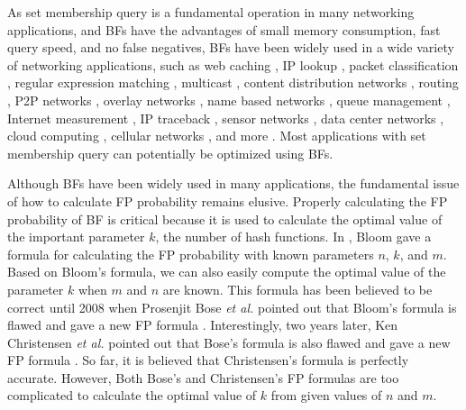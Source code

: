 As set membership query is a fundamental operation in many networking applications, and BFs have the advantages of small memory consumption, fast query speed, and no false negatives, BFs have been widely used in a wide variety of networking applications, such as web caching \cite{webcaching, compressedBFpatent}, IP lookup \cite{sig03PBF, BF_TC, songsig05, HASH-100G}, packet classification \cite{Info04ACPC, Info08memoryPC}, regular expression matching \cite{HPI03deep, HardwareREM}, multicast \cite{BloomCast, Sig02Multicast}, content distribution networks \cite{CDNwww, Sig02informed}, routing \cite{sourceroutingBF, wolfBF}, P2P networks \cite{IAWP2P, P2Psearching}, overlay networks \cite{OverlayMBF, JSAC04Overlay}, name based networks \cite{ BFWY, BFwirelessNDN}, queue management \cite{Info01SFB, Sig06bBF}, Internet measurement \cite{Sig02new, JSAC06measument}, IP traceback \cite{Sig01IPTrace, ICC04scalable}, sensor networks \cite{IPSN07minisec, JSAC05SN}, data center networks \cite{yuConext09, BFDanLi, Info11DCN}, cloud computing \cite{CloudCom11ATree, Cloudcomputingplatform}, cellular networks \cite{PerCom05MANET, WE07securehoc}, and more \cite{shbf, omass}.
%
Most applications with set membership query can potentially be optimized using BFs.

Although BFs have been widely used in many applications, the fundamental issue of how to calculate FP probability remains elusive.
%
Properly calculating the FP probability of BF is critical because it is used to calculate the optimal value of the important parameter $k$, the number of hash functions.
%
In \cite{BF1970}, Bloom gave a formula for calculating the FP probability with known parameters $n$, $k$, and $m$.
%
Based on Bloom's formula, we can also easily compute the optimal value of the parameter $k$ when $m$ and $n$ are known.
%
This formula has been believed to be correct until 2008 when Prosenjit Bose \textit{et al.} pointed out that Bloom's formula is flawed and gave a new FP formula \cite{bose2008false}.
%
Interestingly, two years later, Ken Christensen \textit{et al.} pointed out that Bose's formula is also flawed and gave a new FP formula \cite{ken2010false}.
%
So far, it is believed that Christensen's formula is perfectly accurate.
%
However, Both Bose's and Christensen's FP formulas are too complicated to calculate the optimal value of $k$ from given values of $n$ and $m$.

\presub
